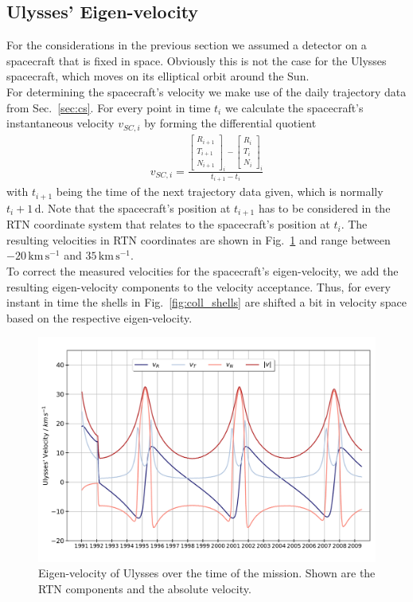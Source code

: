 \subsection{Ulysses' Eigen-velocity}
For the considerations in the previous section we assumed a detector on a spacecraft that is fixed in space. Obviously this is not the case for the Ulysses spacecraft,  which moves on its elliptical orbit around the Sun. \\
For determining the spacecraft's velocity we make use of the daily trajectory data from Sec.~\ref{sec:cs}. For every point in time $t_i$ we calculate the spacecraft's instantaneous velocity $v_{SC,i}$ by forming the differential quotient 
\begin{align*}
v_{SC,i} = \frac{ \begin{bmatrix}R_{i+1}\\T_{i+1}\\N_{i+1}\end{bmatrix}_i  - \begin{bmatrix}R_{i}\\T_{i}\\N_{i}\end{bmatrix}_i} {t_{i+1} - t_i}
\end{align*}
with $t_{i+1}$ being the time of the next trajectory data given, which is normally $t_i + 1\,\mathrm{d}$. Note that the spacecraft's position at $t_{i+1}$ has to be considered in the RTN coordinate system that relates to the spacecraft's position at $t_i$. The resulting velocities in RTN coordinates are shown in Fig.~\ref{fig:eigenv} and range between $-20\,\mathrm{km\,s^{-1}}$ and $35\,\mathrm{km\,s^{-1}}$.
\\
To correct the measured velocities for the spacecraft's eigen-velocity, we add the resulting eigen-velocity components to the velocity acceptance. Thus, for every instant in time the shells in Fig.~\ref{fig:coll_shells} are shifted a bit in velocity space based on the respective eigen-velocity.

\begin{figure}[h]
	\includegraphics[width=1.\textwidth]{Figures/eigenv.pdf}
	\centering
	\caption{Eigen-velocity of Ulysses over the time of the mission. Shown are the RTN components and the absolute velocity.}
	\label{fig:eigenv}
\end{figure}





